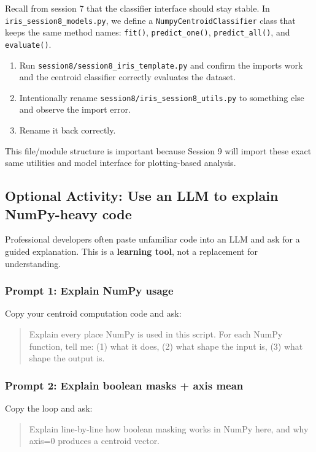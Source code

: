 Recall from session 7 that the classifier interface should stay stable. In \texttt{iris\_session8\_models.py}, we define a \texttt{NumpyCentroidClassifier} class that keeps the same method names: \texttt{fit()}, \texttt{predict\_one()}, \texttt{predict\_all()}, and \texttt{evaluate()}.

\begin{tcolorbox}[title=Do: Your Task]
\begin{enumerate}
    \item Run \texttt{session8/session8\_iris\_template.py} and confirm the imports work and the centroid classifier correctly evaluates the dataset.
    \item Intentionally rename \texttt{session8/iris\_session8\_utils.py} to something else and observe the import error.
    \item Rename it back correctly.
\end{enumerate}
\end{tcolorbox}

\noindent
This file/module structure is important because Session 9 will import these exact same utilities and model interface for plotting-based analysis.

\newpage
\subsection{Optional Activity: Use an LLM to explain NumPy-heavy code}

\noindent
Professional developers often paste unfamiliar code into an LLM and ask for a guided explanation.
This is a \textbf{learning tool}, not a replacement for understanding.

\subsubsection{Prompt 1: Explain NumPy usage}
Copy your centroid computation code and ask:
\begin{quote}
    Explain every place NumPy is used in this script. For each NumPy function, tell me: (1) what it does, (2) what shape the input is, (3) what shape the output is.
\end{quote}

\subsubsection{Prompt 2: Explain boolean masks + axis mean}
Copy the loop and ask:
\begin{quote}
    Explain line-by-line how boolean masking works in NumPy here, and why axis=0 produces a centroid vector.
\end{quote}

